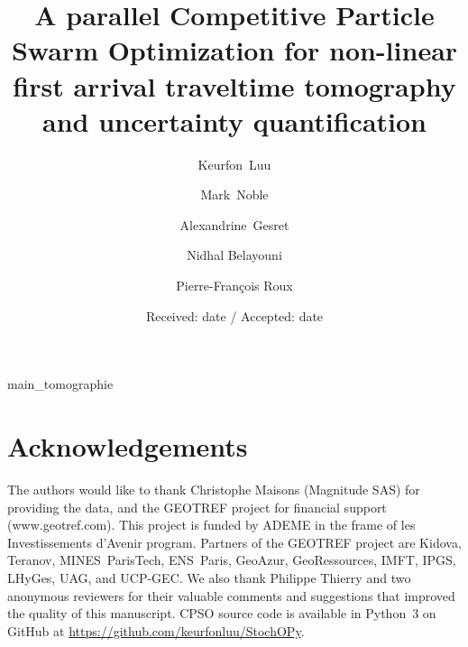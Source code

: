 \documentclass[3p, 10pt, review, times, authoryear]{elsarticle}
\def\revision{red}
\begin{document}
\begin{frontmatter}

\title{
	A parallel Competitive Particle Swarm Optimization for non-linear first arrival traveltime tomography and uncertainty quantification
}

\author[mines]{Keurfon~Luu}

\author[mines]{Mark~Noble}

\author[mines]{Alexandrine~Gesret}

\author[baker]{Nidhal Belayouni}

\author[baker]{Pierre-Fran\c cois Roux}


\address[mines]{
	MINES~ParisTech,~PSL -- Research~University, \\
	Centre de G\'eosciences, \\
	35, rue Saint-Honor\'e, \\
	77305 Fontainebleau, France
}

\address[baker]{
	Baker Hughes, a General Electric company \\
}

\date{Received: date / Accepted: date}

\end{frontmatter}


\linenumbers		%
{main_tomographie}


\section*{Acknowledgements}
\label{sec:acknowledgements}

The authors would like to thank Christophe Maisons (Magnitude SAS) for providing the data, and the GEOTREF project for financial support (www.geotref.com). This project is funded by ADEME in the frame of les Investissements d'Avenir program. Partners of the GEOTREF project are Kidova, Teranov, MINES~ParisTech, ENS~Paris, GeoAzur, GeoRessources, IMFT, IPGS, LHyGes, UAG, and UCP-GEC. We also thank Philippe Thierry and two anonymous reviewers for their valuable comments and suggestions that improved the quality of this manuscript. {\color{\revision}CPSO source code is available in Python~3 on GitHub at \url{https://github.com/keurfonluu/StochOPy}.}
\end{document}
